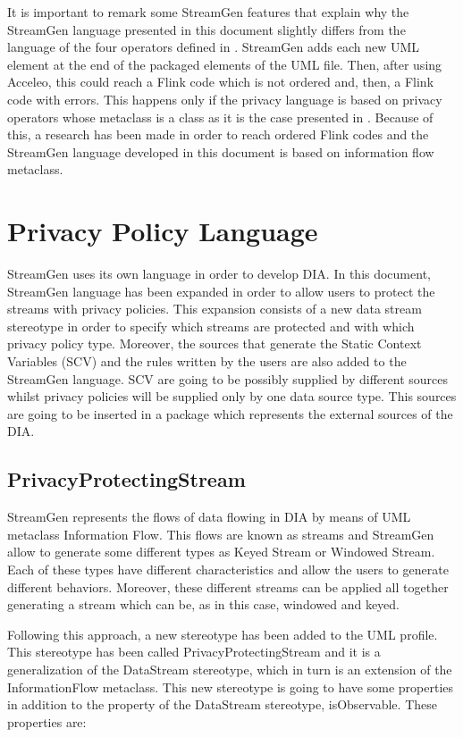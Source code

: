 It is important to remark some StreamGen features that explain why the StreamGen language presented in this document slightly differs from the language of the four operators defined in \cite{privacypoliciesarticle}. StreamGen adds each new UML element at the end of the packaged elements of the UML file. Then, after using Acceleo, this could reach a Flink code which is not ordered and, then, a Flink code with errors. This happens only if the privacy language is based on privacy operators whose metaclass is a class as it is the case presented in \cite{privacypoliciesarticle}. Because of this, a research has been made in order to reach ordered Flink codes and the StreamGen language developed in this document is based on information flow metaclass.

\section{Privacy Policy Language}

StreamGen uses its own language in order to develop DIA. In this document, StreamGen language has been expanded in order to allow users to protect the streams with privacy policies. This expansion consists of a new data stream stereotype in order to specify which streams are protected and with which privacy policy type. Moreover, the sources that generate the Static Context Variables (SCV) and the rules written by the users are also added to the StreamGen language. SCV are going to be possibly supplied by different sources whilst privacy policies will be supplied only by one data source type. This sources are going to be inserted in a package which represents the external sources of the DIA.

\subsection{PrivacyProtectingStream}

StreamGen represents the flows of data flowing in DIA by means of UML metaclass Information Flow. This flows are known as streams and StreamGen allow to generate some different types as Keyed Stream or Windowed Stream. Each of these types have different characteristics and allow the users to generate different behaviors. Moreover, these different streams can be applied all together generating a stream which can be, as in this case, windowed and keyed.

Following this approach, a new stereotype has been added to the UML profile. This stereotype has been called PrivacyProtectingStream and it is a generalization of the DataStream stereotype, which in turn is an extension of the InformationFlow metaclass. This new stereotype is going to have some properties in addition to the property of the DataStream stereotype, isObservable. These properties are:

